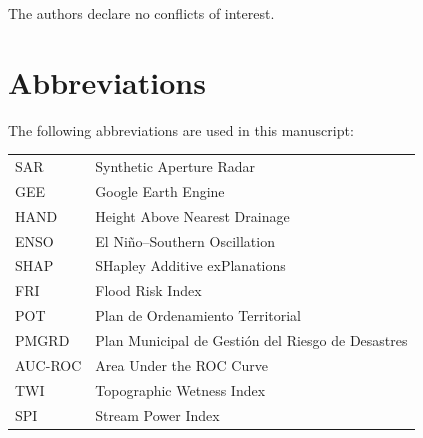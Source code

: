 \documentclass{article}
\begin{document}
The authors declare no conflicts of interest.

\section*{Abbreviations}

The following abbreviations are used in this manuscript:\\

\noindent
\begin{tabular}{@{}ll}
SAR & Synthetic Aperture Radar\\
GEE & Google Earth Engine\\
HAND & Height Above Nearest Drainage\\
ENSO & El Ni\~no--Southern Oscillation\\
SHAP & SHapley Additive exPlanations\\
FRI & Flood Risk Index\\
POT & Plan de Ordenamiento Territorial\\
PMGRD & Plan Municipal de Gesti\'on del Riesgo de Desastres\\
AUC-ROC & Area Under the ROC Curve\\
TWI & Topographic Wetness Index\\
SPI & Stream Power Index
\end{tabular}




\end{document}
